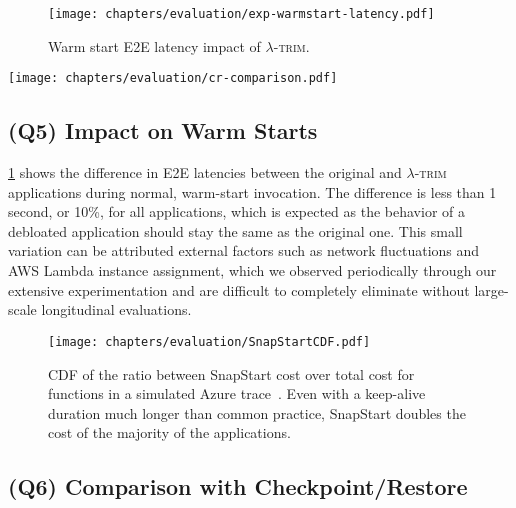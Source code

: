\documentclass[sigplan,nonacm]{acmart}
\newcommand{\sys}{\textsc{\ensuremath{\lambda}-trim}\xspace}
\begin{document}
\begin{figure}[t]
  \centering
    \texttt{[image: chapters/evaluation/exp-warmstart-latency.pdf]}
    \vspace{-1.5em}
  \caption{Warm start E2E latency impact of \sys.}
  \label{fig:warm}
\end{figure}


\begin{figure*}[t]
    \centering
    \texttt{[image: chapters/evaluation/cr-comparison.pdf]}
    \vspace{-1.2em}
    \caption{Comparison of initialization time between \sys, C/R and C/R + \sys.}
    \label{fig:cr-comparison}
\end{figure*}

\subsection{(Q5) Impact on Warm Starts}

    


\cref{fig:warm} shows the difference in E2E latencies between the original and \sys applications during normal, warm-start invocation.
The difference is less than 1 second, or 10\%, for all applications, which is expected as the behavior of a debloated application should stay the same as the original one.
This small variation can be attributed external factors such as network fluctuations and AWS Lambda instance assignment, which we observed periodically through our extensive experimentation and are difficult to completely eliminate without large-scale longitudinal evaluations.



 

\begin{figure}[t]
    \texttt{[image: chapters/evaluation/SnapStartCDF.pdf]}

\vspace{-0.7em}
  \caption{CDF of the ratio between SnapStart cost over total cost for functions in a simulated Azure trace~\cite{wild2020}.
Even with a keep-alive duration much longer than common practice, SnapStart doubles the cost of the majority of the applications.
}
  \label{fig:SnapStartCDF}
\end{figure}


\subsection{(Q6) Comparison with Checkpoint/Restore}
\label{sec:eval-cr}
\end{document}
